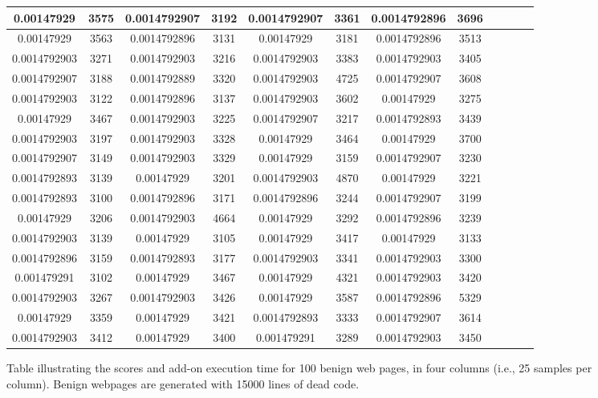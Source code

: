\begin{figure}[h]
\begin{tabular}{|c|c|c|c|c|c|c|c|c|c|c|c|}
\midrule
0.00147929&3575&0.0014792907&3192&0.0014792907&3361&0.0014792896&3696\\
\midrule
0.00147929&3563&0.0014792896&3131&0.00147929&3181&0.0014792896&3513\\
\midrule
0.0014792903&3271&0.0014792903&3216&0.0014792903&3383&0.0014792903&3405\\
\midrule
0.0014792907&3188&0.0014792889&3320&0.0014792903&4725&0.0014792907&3608\\
\midrule
0.0014792903&3122&0.0014792896&3137&0.0014792903&3602&0.00147929&3275\\
\midrule
0.00147929&3467&0.0014792903&3225&0.0014792907&3217&0.0014792893&3439\\
\midrule
0.0014792903&3197&0.0014792903&3328&0.00147929&3464&0.00147929&3700\\
\midrule
0.0014792907&3149&0.0014792903&3329&0.00147929&3159&0.0014792907&3230\\
\midrule
0.0014792893&3139&0.00147929&3201&0.0014792903&4870&0.00147929&3221\\
\midrule
0.0014792893&3100&0.0014792896&3171&0.0014792896&3244&0.0014792907&3199\\
\midrule
0.00147929&3206&0.0014792903&4664&0.00147929&3292&0.0014792896&3239\\
\midrule
0.0014792903&3139&0.00147929&3105&0.00147929&3417&0.00147929&3133\\
\midrule
0.0014792896&3159&0.0014792893&3177&0.0014792903&3341&0.0014792903&3300\\
\midrule
0.001479291&3102&0.00147929&3467&0.00147929&4321&0.0014792903&3420\\
\midrule
0.0014792903&3267&0.0014792903&3426&0.00147929&3587&0.0014792896&5329\\
\midrule
0.00147929&3359&0.00147929&3421&0.0014792893&3333&0.0014792907&3614\\
\midrule
0.0014792903&3412&0.00147929&3400&0.001479291&3289&0.0014792903&3450\\
\midrule
\end{tabular}
    \caption[Scores table of benign web pages]{Table illustrating the scores and add-on execution time for 100 benign web pages, in four columns (i.e., 25 samples per column). Benign webpages are generated with 15000 lines of dead code.}
    \label{fig:b15000table}
\end{figure}
